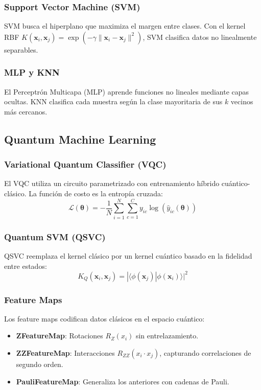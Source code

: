 \subsubsection{Support Vector Machine (SVM)}
SVM busca el hiperplano que maximiza el margen entre clases. Con el kernel RBF $K(\mathbf{x}_i, \mathbf{x}_j) = \exp(-\gamma\|\mathbf{x}_i - \mathbf{x}_j\|^2)$, SVM clasifica datos no linealmente separables.

\subsubsection{MLP y KNN}
El Perceptr\'on Multicapa (MLP) aprende funciones no lineales mediante capas ocultas. KNN clasifica cada muestra seg\'un la clase mayoritaria de sus $k$ vecinos m\'as cercanos.

\subsection{Quantum Machine Learning}

\subsubsection{Variational Quantum Classifier (VQC)}
El VQC \citep{havlicek2019} utiliza un circuito parametrizado con entrenamiento h\'ibrido cu\'antico-cl\'asico. La funci\'on de costo es la entrop\'ia cruzada:
\begin{equation}
\mathcal{L}(\boldsymbol{\theta}) = -\frac{1}{N}\sum_{i=1}^{N}\sum_{c=1}^{C} y_{ic} \log(\hat{y}_{ic}(\boldsymbol{\theta}))
\end{equation}

\subsubsection{Quantum SVM (QSVC)}
QSVC \citep{rebentrost2014} reemplaza el kernel cl\'asico por un kernel cu\'antico basado en la fidelidad entre estados:
\begin{equation}
K_Q(\mathbf{x}_i, \mathbf{x}_j) = |\langle\phi(\mathbf{x}_j)|\phi(\mathbf{x}_i)\rangle|^2
\end{equation}

\subsubsection{Feature Maps}
Los feature maps codifican datos cl\'asicos en el espacio cu\'antico:
\begin{itemize}
    \item \textbf{ZFeatureMap}: Rotaciones $R_Z(x_i)$ sin entrelazamiento.
    \item \textbf{ZZFeatureMap}: Interacciones $R_{ZZ}(x_i \cdot x_j)$, capturando correlaciones de segundo orden.
    \item \textbf{PauliFeatureMap}: Generaliza los anteriores con cadenas de Pauli.
\end{itemize}

